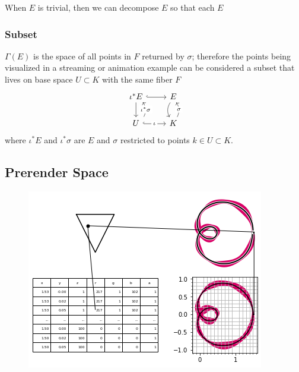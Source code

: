 \documentclass[../main.tex]{subfiles}
\begin{document}

When $E$ is trivial, then we can decompose $E$ so that each $E$ 


\subsubsection{Subset}
$\Gamma(E)$ is the space of all points in $F$ returned by $\sigma$; therefore the points being visualized in a streaming or animation example can be considered a subset that lives on base space $U \subset K$ with the same fiber $F$
\begin{equation}
    \begin{tikzcd}
        \iota^\ast E \arrow[r, hook] \arrow[d]                                                                       & E \arrow[d, bend right]                       \\
        U \arrow[r, "\iota" description, hook] \arrow[u, "\iota^\ast \sigma" description, bend right, shift right=2] & K \arrow[u, "\sigma" description, bend right]
    \end{tikzcd}    
\end{equation}
where $\iota^*E$ and $\iota^*\sigma$ are $E$ and $\sigma$ restricted to points $k \in U \subset K$.   


\subsection{Prerender Space}
\label{sec:display}

\begin{figure}[h]
    \includegraphics[width=.4\linewidth]{figures/sections/math/render.png}
    \caption{}
    \label{fig:render}
\end{figure}
\end{document}
